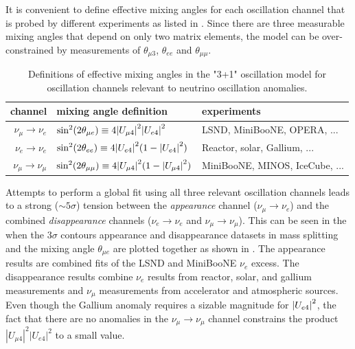 It is convenient to define effective mixing angles for each oscillation channel that is probed by different experiments as listed in . Since there are three measurable mixing angles that depend on only two matrix elements, the model can be over-constrained by measurements of $\theta_{\mu 3}$, $\theta_{ee}$ and $\theta_{\mu\mu}$.
\begin{table}
    \caption{Definitions of effective mixing angles in the "3+1" oscillation model for oscillation channels relevant to neutrino oscillation anomalies.\label{tab:effective-mixing-definitions}}
    \begin{tabular}{rl>{\raggedright\arraybackslash}p{3cm}}\toprule
        channel & mixing angle definition & experiments \\ \midrule
        $\nu_\mu \rightarrow \nu_e$ & $\sin^2(2\theta_{\mu e}) \equiv 4\abs{U_{\mu 4}}^2\abs{U_{e4}}^2$ & LSND, MiniBooNE, OPERA, ... \\
        $\nu_e \rightarrow \nu_e$ & $\sin^2(2\theta_{e e}) \equiv 4\abs{U_{e 4}}^2(1 - \abs{U_{e4}}^2)$ & Reactor, solar, Gallium, ... \\
        $\nu_\mu \rightarrow \nu_\mu$ & $\sin^2(2\theta_{\mu \mu}) \equiv 4\abs{U_{\mu 4}}^2(1 - \abs{U_{\mu4}}^2)$ & MiniBooNE, MINOS, IceCube, ... \\ \bottomrule
    \end{tabular}
\end{table}
Attempts to perform a global fit using all three relevant oscillation channels leads to a strong ($\sim 5\sigma$) tension between the \emph{appearance} channel ($\nu_\mu \rightarrow \nu_e$) and the combined \emph{disappearance} channels ($\nu_e \rightarrow \nu_e$ and $\nu_\mu \rightarrow \nu_\mu$)\cite{Dentler_2018}. This can be seen in the when the $3\sigma$ contours appearance and disappearance datasets in mass splitting and the mixing angle $\theta_{\mu e}$ are plotted together as shown in . The appearance results are combined fits of the LSND and MiniBooNE $\nu_e$ excess. The disappearance results combine $\nu_e$ results from reactor, solar, and gallium measurements and $\nu_\mu$ measurements from accelerator and atmospheric sources. Even though the Gallium anomaly requires a sizable magnitude for $\abs{U_{e4}}^2$, the fact that there are no anomalies in the $\nu_\mu \rightarrow \nu_\mu$ channel constrains the product $|U_{\mu 4}|^2|U_{e4}|^2$ to a small value.
